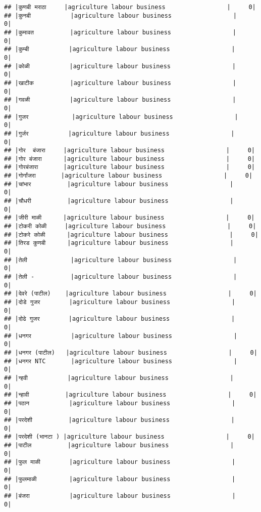 \documentclass[
]{article}
\begin{document}
\begin{verbatim}
## |कुणबी मराठा     |agriculture labour business                 |     0|
## |कुनबी           |agriculture labour business                 |     0|
## |कुमावत          |agriculture labour business                 |     0|
## |कुम्बी           |agriculture labour business                 |     0|
## |कोळी           |agriculture labour business                 |     0|
## |खाटीक          |agriculture labour business                 |     0|
## |गवळी           |agriculture labour business                 |     0|
## |गुजर            |agriculture labour business                 |     0|
## |गुर्जर           |agriculture labour business                 |     0|
## |गोर  बंजारा     |agriculture labour business                 |     0|
## |गोर बंजारा      |agriculture labour business                 |     0|
## |गोरबंजारा       |agriculture labour business                 |     0|
## |गोर्गांजरा       |agriculture labour business                 |     0|
## |चांभार          |agriculture labour business                 |     0|
## |चौधरी          |agriculture labour business                 |     0|
## |जीरी माळी      |agriculture labour business                 |     0|
## |टोकरी कोळी     |agriculture labour business                 |     0|
## |टोकरे कोळी      |agriculture labour business                 |     0|
## |तिरड कुणबी      |agriculture labour business                 |     0|
## |तेली            |agriculture labour business                 |     0|
## |तेली -          |agriculture labour business                 |     0|
## |देवरे (पाटील)    |agriculture labour business                 |     0|
## |दोडे गुजर        |agriculture labour business                 |     0|
## |दोढे गुजर        |agriculture labour business                 |     0|
## |धनगर           |agriculture labour business                 |     0|
## |धनगर (पाटील)   |agriculture labour business                 |     0|
## |धनगर NTC       |agriculture labour business                 |     0|
## |न्हवी           |agriculture labour business                 |     0|
## |न्हावी          |agriculture labour business                 |     0|
## |पठान           |agriculture labour business                 |     0|
## |परदेशी          |agriculture labour business                 |     0|
## |परदेशी (भानटा ) |agriculture labour business                 |     0|
## |पाटील          |agriculture labour business                 |     0|
## |फुल माळी        |agriculture labour business                 |     0|
## |फुलमाळी         |agriculture labour business                 |     0|
## |बंजरा           |agriculture labour business                 |     0|

\end{verbatim}
\end{document}
